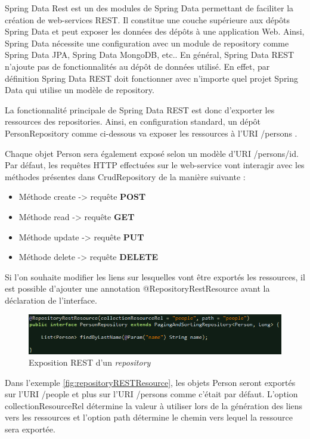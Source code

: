 \documentclass{polytech/polytech}
\begin{document}
Spring Data Rest est un des modules de Spring Data permettant de faciliter la création de web-services REST. Il constitue une couche supérieure aux dépôts Spring Data et peut exposer les données des dépôts à une application Web. Ainsi, Spring Data nécessite une configuration avec un module de repository comme Spring Data JPA, Spring Data MongoDB, etc.. En général, Spring Data REST n’ajoute pas de fonctionnalités au dépôt de données utilisé. En effet, par définition Spring Data REST doit fonctionner avec n’importe quel projet Spring Data qui utilise un modèle de repository.

La fonctionnalité principale de Spring Data REST est donc d’exporter les ressources des repositories. Ainsi, en configuration standard, un dépôt PersonRepository comme ci-dessous va exposer les ressources à l’URI /persons .


Chaque objet Person sera également exposé selon un modèle d’URI /persons/{id}. Par défaut, les requêtes HTTP effectuées sur le web-service vont interagir avec les méthodes présentes dans CrudRepository de la manière suivante : 

\begin{itemize}
	\item Méthode create -> requête \textbf{POST}
	\item Méthode read -> requête \textbf{GET}
	\item Méthode update -> requête \textbf{PUT}
	\item Méthode delete -> requête \textbf{DELETE}
\end{itemize}

Si l’on souhaite modifier les liens sur lesquelles vont être exportés les ressources, il est possible d’ajouter une annotation @RepositoryRestResource avant la déclaration de l’interface.

\begin{figure}
	\includegraphics[scale=0.85]{images/repositoryRESTResource}
	\caption{Exposition REST d'un \textit{repository}}
	\label{fig:repositoryRESTResource}
\end{figure}

Dans l’exemple \autoref{fig:repositoryRESTResource}, les objets Person seront exportés sur l’URI /people et plus sur l’URI /persons comme c’était par défaut. L’option collectionResourceRel détermine la valeur à utiliser lors de la génération des liens vers les ressources et l’option path détermine le chemin vers lequel la ressource sera exportée. 
\end{document}
